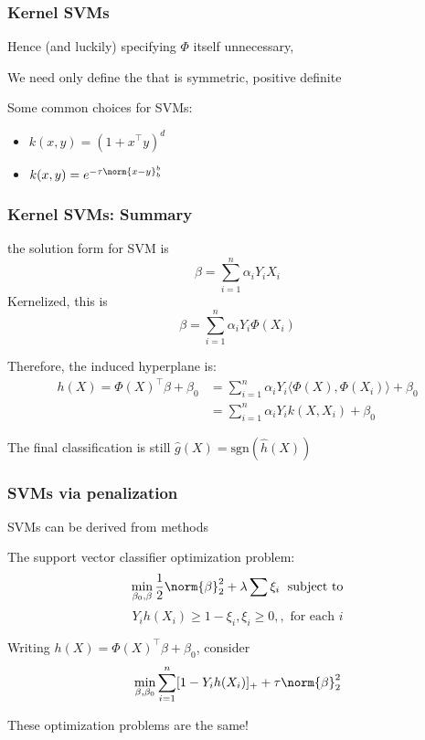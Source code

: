 \documentclass[12pt]{beamer}
\begin{document}
\begin{frame}
\frametitle{Kernel SVMs}
Hence (and luckily) specifying $\Phi$ itself unnecessary, 


\vsp
We need only define the  that is symmetric, positive definite

\vsp
Some common choices for SVMs:
\begin{itemize}
\item {} $k(x,y) = (1 + x^{\top}y)^d$
\item {} $k(x,y) = e^{-\tau \norm{x-y}_{b}^b}$

\end{itemize}
\end{frame}

\begin{frame}
\frametitle{Kernel SVMs: Summary}
 the solution form for SVM is
\[
\beta = \sum_{i=1}^n \alpha_i Y_i X_i
\]
Kernelized, this is
\[
\beta = \sum_{i=1}^n \alpha_i Y_i \Phi(X_i)
\]

Therefore, the induced hyperplane is:
\begin{align*}
h(X) = \Phi(X)^{\top} \beta + \beta_0 
& = 
\sum_{i=1}^n \alpha_i Y_i \langle \Phi(X), \Phi(X_i) \rangle + \beta_0\\
& = 
\sum_{i=1}^n \alpha_i Y_i k(X,X_i)  + \beta_0
\end{align*}

The final classification is still $\hat g(X) = \textrm{sgn}(\hat{h}(X))$ 


\end{frame}


\begin{frame}
\frametitle{SVMs via penalization}
  SVMs can be derived from  methods

\vsp
The support vector classifier optimization problem:
\[
\min_{\beta_0,\beta} \frac{1}{2}\norm{\beta}_2^2 + \lambda\sum \xi_i \; \textrm{ subject to}
\]
\[
Y_ih(X_i) \geq 1  - \xi_i, \xi_i \geq 0, , \textrm{ for each } i
\]


\vsp
Writing $h(X) = \Phi(X)^{\top} \beta + \beta_0$, consider
\[
\min_{\beta,\beta_0} \sum_{i=1}^n [ 1 - Y_i h(X_i)]_+ + \tau\norm{\beta}_2^2 
\]

These optimization problems are the same! 


\end{frame}
\end{document}
